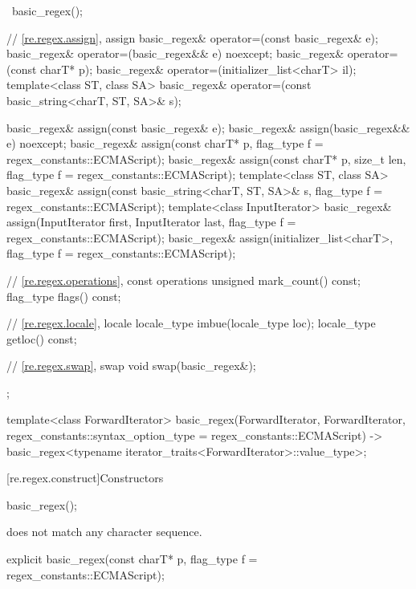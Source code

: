 \begin{codeblock}
{{      ~basic_regex();

      // \ref{re.regex.assign}, assign
      basic_regex& operator=(const basic_regex& e);
      basic_regex& operator=(basic_regex&& e) noexcept;
      basic_regex& operator=(const charT* p);
      basic_regex& operator=(initializer_list<charT> il);
      template<class ST, class SA>
        basic_regex& operator=(const basic_string<charT, ST, SA>& s);

      basic_regex& assign(const basic_regex& e);
      basic_regex& assign(basic_regex&& e) noexcept;
      basic_regex& assign(const charT* p, flag_type f = regex_constants::ECMAScript);
      basic_regex& assign(const charT* p, size_t len, flag_type f = regex_constants::ECMAScript);
      template<class ST, class SA>
        basic_regex& assign(const basic_string<charT, ST, SA>& s,
                            flag_type f = regex_constants::ECMAScript);
      template<class InputIterator>
        basic_regex& assign(InputIterator first, InputIterator last,
                            flag_type f = regex_constants::ECMAScript);
      basic_regex& assign(initializer_list<charT>,
                          flag_type f = regex_constants::ECMAScript);

      // \ref{re.regex.operations}, const operations
      unsigned mark_count() const;
      flag_type flags() const;

      // \ref{re.regex.locale}, locale
      locale_type imbue(locale_type loc);
      locale_type getloc() const;

      // \ref{re.regex.swap}, swap
      void swap(basic_regex&);
    };

  template<class ForwardIterator>
    basic_regex(ForwardIterator, ForwardIterator,
                regex_constants::syntax_option_type = regex_constants::ECMAScript)
      -> basic_regex<typename iterator_traits<ForwardIterator>::value_type>;
}
\end{codeblock}

[re.regex.construct]{Constructors}

%
\begin{itemdecl}
basic_regex();
\end{itemdecl}

\begin{itemdescr}
\pnum
\ensures
{} does not match any character sequence.
\end{itemdescr}

%
\begin{itemdecl}
explicit basic_regex(const charT* p, flag_type f = regex_constants::ECMAScript);
\end{itemdecl}

